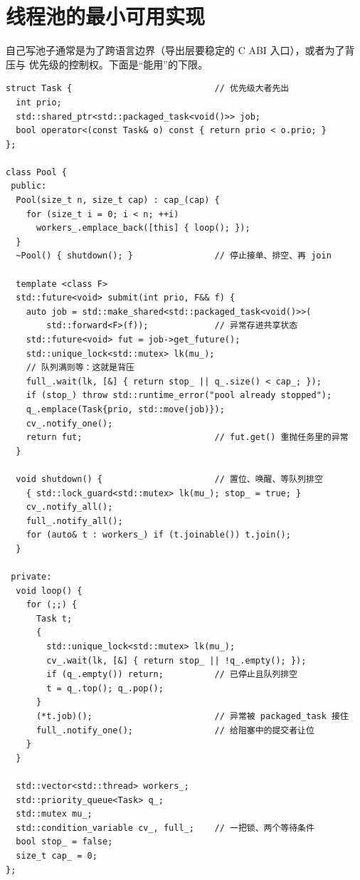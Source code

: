 \documentclass[12pt,a4paper,fontset=fandol]{ctexbook}
\begin{document}
\section{线程池的最小可用实现}

自己写池子通常是为了跨语言边界（导出层要稳定的 C ABI 入口），或者为了背压与
优先级的控制权。下面是``能用''的下限。

\begin{lstlisting}[style=cppstyle,caption={最小可用线程池：有界队列、优雅关闭、异常传播}]
struct Task {                            // 优先级大者先出
  int prio;
  std::shared_ptr<std::packaged_task<void()>> job;
  bool operator<(const Task& o) const { return prio < o.prio; }
};

class Pool {
 public:
  Pool(size_t n, size_t cap) : cap_(cap) {
    for (size_t i = 0; i < n; ++i)
      workers_.emplace_back([this] { loop(); });
  }
  ~Pool() { shutdown(); }                // 停止接单、排空、再 join

  template <class F>
  std::future<void> submit(int prio, F&& f) {
    auto job = std::make_shared<std::packaged_task<void()>>(
        std::forward<F>(f));             // 异常存进共享状态
    std::future<void> fut = job->get_future();
    std::unique_lock<std::mutex> lk(mu_);
    // 队列满则等：这就是背压
    full_.wait(lk, [&] { return stop_ || q_.size() < cap_; });
    if (stop_) throw std::runtime_error("pool already stopped");
    q_.emplace(Task{prio, std::move(job)});
    cv_.notify_one();
    return fut;                          // fut.get() 重抛任务里的异常
  }

  void shutdown() {                      // 置位、唤醒、等队列排空
    { std::lock_guard<std::mutex> lk(mu_); stop_ = true; }
    cv_.notify_all();
    full_.notify_all();
    for (auto& t : workers_) if (t.joinable()) t.join();
  }

 private:
  void loop() {
    for (;;) {
      Task t;
      {
        std::unique_lock<std::mutex> lk(mu_);
        cv_.wait(lk, [&] { return stop_ || !q_.empty(); });
        if (q_.empty()) return;          // 已停止且队列排空
        t = q_.top(); q_.pop();
      }
      (*t.job)();                        // 异常被 packaged_task 接住
      full_.notify_one();                // 给阻塞中的提交者让位
    }
  }

  std::vector<std::thread> workers_;
  std::priority_queue<Task> q_;
  std::mutex mu_;
  std::condition_variable cv_, full_;    // 一把锁、两个等待条件
  bool stop_ = false;
  size_t cap_ = 0;
};
\end{lstlisting}
\end{document}
